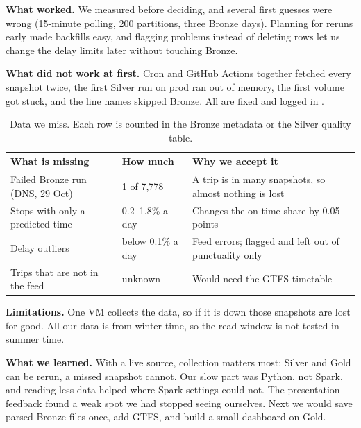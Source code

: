 \textbf{What worked.} We measured before deciding, and several first guesses were wrong
(15-minute polling, 200 partitions, three Bronze days). Planning for reruns early made
backfills easy, and flagging problems instead of deleting rows let us change the delay limits
later without touching Bronze.

\textbf{What did not work at first.} Cron and GitHub Actions together fetched every snapshot
twice, the first Silver run on prod ran out of memory, the first volume got stuck, and the line
names skipped Bronze. All are fixed and logged in .

\begin{table}[htb]
\caption{Data we miss. Each row is counted in the Bronze metadata or the Silver quality table.}
\label{tab:missing}
\centering\footnotesize
\renewcommand{\arraystretch}{1.25}
\begin{tabularx}{\linewidth}{@{}>{\raggedright}p{2.5cm}>{\raggedright}p{1.6cm}>{\raggedright\arraybackslash}X@{}}
\toprule
What is missing & How much & Why we accept it \\
\midrule
Failed Bronze run (DNS, 29 Oct) & 1 of 7{,}778 & A trip is in many snapshots, so almost nothing is lost \\
Stops with only a predicted time & 0.2--1.8\% a day & Changes the on-time share by 0.05 points \\
Delay outliers & below 0.1\% a day & Feed errors; flagged and left out of punctuality only \\
Trips that are not in the feed & unknown & Would need the GTFS timetable \\
\bottomrule
\end{tabularx}
\end{table}

\textbf{Limitations.} One VM collects the data, so if it is down those snapshots are lost for
good. All our data is from winter time, so the read window is not tested in summer time.

\textbf{What we learned.} With a live source, collection matters most: Silver and Gold can be
rerun, a missed snapshot cannot. Our slow part was Python, not Spark, and reading less data
helped where Spark settings could not. The presentation feedback found a weak spot we had
stopped seeing ourselves. Next we would save parsed Bronze files once, add GTFS, and build a
small dashboard on Gold.
